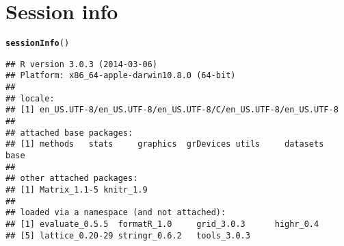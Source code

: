 \documentclass{article}\usepackage[]{graphicx}\usepackage[]{color}
\makeatletter
\newcommand{\hlstd}[1]{\textcolor[rgb]{0.345,0.345,0.345}{#1}}%
\newcommand{\hlkwd}[1]{\textcolor[rgb]{0.737,0.353,0.396}{\textbf{#1}}}%
\newenvironment{kframe}{%
 \def\at@end@of@kframe{}%
 \ifinner\ifhmode%
  \def\at@end@of@kframe{\end{minipage}}%
  \begin{minipage}{\columnwidth}%
 \fi\fi%
 \def\FrameCommand##1{\hskip\@totalleftmargin \hskip-\fboxsep
 \colorbox{shadecolor}{##1}\hskip-\fboxsep
     \hskip-\linewidth \hskip-\@totalleftmargin \hskip\columnwidth}%
 \MakeFramed {\advance\hsize-\width
   \@totalleftmargin\z@ \linewidth\hsize
   \@setminipage}}%
 {\par\unskip\endMakeFramed%
 \at@end@of@kframe}
\newenvironment{knitrout}{}{} %
\makeatother
\begin{document}
\section{Session info}
\label{sec.sessioninfo}

\begin{knitrout}
\color{fgcolor}\begin{kframe}
\begin{alltt}
\hlkwd{sessionInfo}\hlstd{()}
\end{alltt}
\begin{verbatim}
## R version 3.0.3 (2014-03-06)
## Platform: x86_64-apple-darwin10.8.0 (64-bit)
## 
## locale:
## [1] en_US.UTF-8/en_US.UTF-8/en_US.UTF-8/C/en_US.UTF-8/en_US.UTF-8
## 
## attached base packages:
## [1] methods   stats     graphics  grDevices utils     datasets  base     
## 
## other attached packages:
## [1] Matrix_1.1-5 knitr_1.9   
## 
## loaded via a namespace (and not attached):
## [1] evaluate_0.5.5  formatR_1.0     grid_3.0.3      highr_0.4      
## [5] lattice_0.20-29 stringr_0.6.2   tools_3.0.3
\end{verbatim}
\end{kframe}
\end{knitrout}



\end{document}
